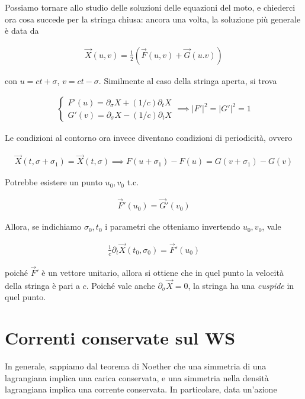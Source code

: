 \documentclass{report}
\begin{document}
Possiamo tornare allo studio delle soluzioni delle equazioni del moto, e chiederci ora cosa succede per la stringa chiusa: ancora una volta, la soluzione più generale è data da 

\begin{align}
    \vec{X}(u,v) = \frac{1}{2}(\vec{F}(u,v) + \vec{G}(u.v))
\end{align}

con \(u = ct+\sigma\), \(v = ct-\sigma\). Similmente al caso della stringa aperta, si trova 

\begin{align}
    \begin{cases}
        F'(u) = \partial_\sigma X + (1/c)\partial_t X \\
        G'(v) = \partial_\sigma X - (1/c)\partial_t X
    \end{cases} \implies |F'|^2 = |G'|^2 = 1
\end{align}

Le condizioni al contorno ora invece diventano condizioni di periodicità, ovvero 

\begin{align}
    \vec{X}(t, \sigma+\sigma_1) = \vec{X}(t, \sigma) \implies F(u+\sigma_1) - F(u) = G(v+\sigma_1) - G(v)
\end{align}

Potrebbe esistere un punto \(u_0, v_0\) t.c. 

\begin{align}
    \vec{F}'(u_0) = \vec{G}'(v_0) 
\end{align}

Allora, se indichiamo \(\sigma_0, t_0\) i parametri che otteniamo invertendo \(u_0, v_0\), vale 

\begin{align}
    \frac{1}{c}\partial_t\vec{X}(t_0, \sigma_0) = \vec{F}'(u_0)  
\end{align}

poiché \(\vec{F}'\) è un vettore unitario, allora si ottiene che in quel punto la velocità della stringa è pari a \(c\). Poiché vale anche \(\partial_\sigma \vec{X} =0\), la stringa ha una \emph{cuspide} in quel punto. 

\section{Correnti conservate sul WS}

In generale, sappiamo dal teorema di Noether che una simmetria di una lagrangiana implica una carica conservata, e una simmetria nella densità lagrangiana implica una corrente conservata. In particolare, data un'azione 
\end{document}
